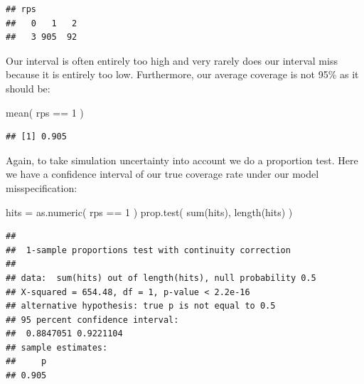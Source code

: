 \documentclass[
]{book}
\newenvironment{Shaded}{\begin{snugshade}}{\end{snugshade}}
\newcommand{\DecValTok}[1]{\textcolor[rgb]{0.00,0.00,0.81}{#1}}
\newcommand{\FunctionTok}[1]{\textcolor[rgb]{0.00,0.00,0.00}{#1}}
\newcommand{\NormalTok}[1]{#1}
\newcommand{\OtherTok}[1]{\textcolor[rgb]{0.56,0.35,0.01}{#1}}
\newcommand{\SpecialCharTok}[1]{\textcolor[rgb]{0.00,0.00,0.00}{#1}}
\begin{document}
\begin{Shaded}
\end{Shaded}

\begin{verbatim}
## rps
##   0   1   2 
##   3 905  92
\end{verbatim}

Our interval is often entirely too high and very rarely does our interval miss
because it is entirely too low.
Furthermore, our average coverage is not 95\% as it should be:

\begin{Shaded}
\begin{Highlighting}[]
\FunctionTok{mean}\NormalTok{( rps }\SpecialCharTok{==} \DecValTok{1}\NormalTok{ )}
\end{Highlighting}
\end{Shaded}

\begin{verbatim}
## [1] 0.905
\end{verbatim}

Again, to take simulation uncertainty into account we do a proportion test.
Here we have a confidence interval of our true coverage rate under our model
misspecification:

\begin{Shaded}
\begin{Highlighting}[]
\NormalTok{hits }\OtherTok{=} \FunctionTok{as.numeric}\NormalTok{( rps }\SpecialCharTok{==} \DecValTok{1}\NormalTok{ )}
\FunctionTok{prop.test}\NormalTok{( }\FunctionTok{sum}\NormalTok{(hits), }\FunctionTok{length}\NormalTok{(hits) )}
\end{Highlighting}
\end{Shaded}

\begin{verbatim}
## 
##  1-sample proportions test with continuity correction
## 
## data:  sum(hits) out of length(hits), null probability 0.5
## X-squared = 654.48, df = 1, p-value < 2.2e-16
## alternative hypothesis: true p is not equal to 0.5
## 95 percent confidence interval:
##  0.8847051 0.9221104
## sample estimates:
##     p 
## 0.905
\end{verbatim}
\end{document}
